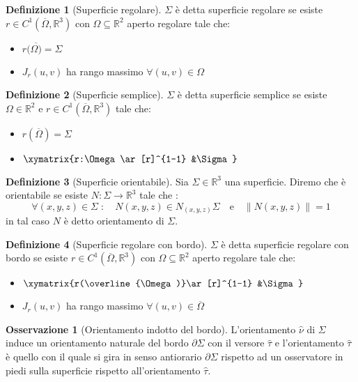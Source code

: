 \documentclass[leqno]{article}
\theoremstyle{definition}
\newtheorem{definition}{Definizione}[section]
\numberwithin{equation}{section}
\newtheorem{observation}[theorem]{Osservazione}
\theoremstyle{remark}
\begin{document}
	\begin{definition}[Superficie regolare]
		$\Sigma$ è detta superficie regolare se esiste $r\in C^1(\overline{\Omega}, \mathbb{R}^3)$ con $\Omega \subseteq \mathbb{R}^2$ aperto regolare tale che:
		\begin{itemize}
			\item $r(\overline{\Omega)}=\Sigma$
			\item $J_r(u,v)$ ha rango massimo $\forall (u,v)\in \Omega$
		\end{itemize}
	\end{definition}
	
	\begin{definition}[Superficie semplice]
		$\Sigma$ è detta superficie semplice se esiste $\Omega \in \mathbb{R}^2$ e $r\in C^1(\overline{\Omega},\mathbb{R}^3)$ tale che:
		\begin{itemize}
			\item $r(\overline{\Omega})=\Sigma$
			\item $\xymatrix{r:\Omega \ar[r]^{1-1} &\Sigma}$
		\end{itemize}
	\end{definition}
	
	\begin{definition}[Superficie orientabile]
		Sia $\Sigma \in \mathbb{R}^3 $ una superficie. Diremo che è   orientabile se esiste $N:\Sigma \to \mathbb{R}^3$ tale che :
		\begin{equation}
			\forall(x,y,z)\in \Sigma \; : \quad N(x,y,z)\in N_{(x,y,z)}\Sigma \quad \text{e} \quad \lVert N(x,y,z) \rVert = 1
		\end{equation}
		in tal caso $N$ è detto orientamento di $\Sigma$.
	\end{definition}
	
	\begin{definition}[Superficie regolare con bordo]
		$\Sigma$ è detta superficie regolare con bordo se esiste $r\in C^1(\overline{\Omega}, \mathbb{R}^3)$ con $\Omega \subseteq \mathbb{R}^2$ aperto regolare tale che:
		\begin{itemize}
			\item $\xymatrix{r(\overline{\Omega)}\ar[r]^{1-1} &\Sigma}$
			\item $J_r(u,v)$ ha rango massimo $\forall (u,v)\in \overline{\Omega}$
		\end{itemize}
	\end{definition}
	
	\begin{observation}[Orientamento indotto del bordo]
		L'orientamento $\hat{\nu}$ di $\Sigma$ induce un orientamento naturale del bordo $\partial \Sigma$ con il versore $\hat{\tau}$ e l'orientamento $\hat{\tau}$ è quello con il quale si gira in senso antiorario $\partial\Sigma$ rispetto ad un osservatore in piedi sulla superficie rispetto all'orientamento $\hat{\tau}$.
	\end{observation}
	
\end{document}

